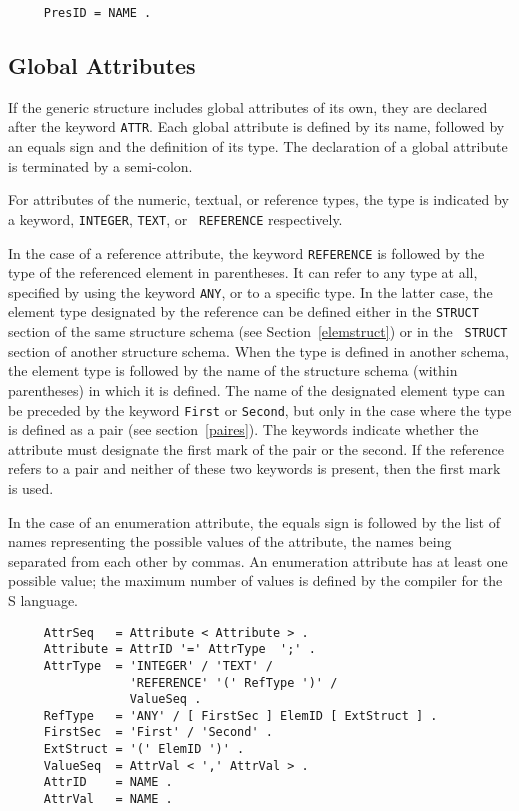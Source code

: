 \begin{verbatim}
     PresID = NAME .
\end{verbatim}

\subsection{Global Attributes}
\label{attrglobaux}

If the generic structure includes global attributes of its own, they
are declared after the keyword {\tt ATTR}.  Each global attribute is
defined by its name, followed by an equals sign and the definition of
its type.  The declaration of a global attribute is terminated by a
semi-colon.

For attributes of the numeric, textual, or reference types, the type
is indicated by a keyword, {\tt INTEGER}, {\tt TEXT}, or {\tt
REFERENCE} respectively.

In the case of a reference attribute, the keyword {\tt REFERENCE} is
followed by the type of the referenced element in parentheses.  It can
refer to any type at all, specified by using the keyword {\tt ANY}, or
to a specific type.  In the latter case, the element type designated by
the reference can be defined either in the {\tt STRUCT} section of the
same structure schema (see Section~\ref{elemstruct}) or in the {\tt
STRUCT} section of another structure schema.  When the type is defined
in another schema, the element type is followed by the name of the
structure schema (within parentheses) in which it is defined.  The
name of the designated element type can be preceded by the keyword
{\tt First} or {\tt Second}, but only in the case where the type is
defined as a pair (see section~\ref{paires}).  The keywords indicate
whether the attribute must designate the first mark of the pair or the
second.  If the reference refers to a pair and neither of these two
keywords is present, then the first mark is used.

In the case of an enumeration attribute, the equals sign is followed
by the list of names representing the possible values of the
attribute, the names being separated from each other by commas.  An
enumeration attribute has at least one possible value; the maximum
number of values is defined by the compiler for the S language.

\begin{verbatim}
     AttrSeq   = Attribute < Attribute > .
     Attribute = AttrID '=' AttrType  ';' .
     AttrType  = 'INTEGER' / 'TEXT' /
                 'REFERENCE' '(' RefType ')' /
                 ValueSeq .
     RefType   = 'ANY' / [ FirstSec ] ElemID [ ExtStruct ] .
     FirstSec  = 'First' / 'Second' .
     ExtStruct = '(' ElemID ')' .
     ValueSeq  = AttrVal < ',' AttrVal > .
     AttrID    = NAME .
     AttrVal   = NAME .
\end{verbatim}

